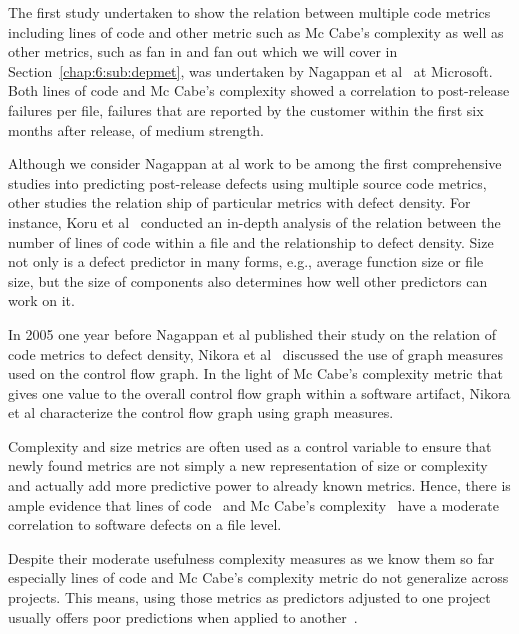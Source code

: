 The first study undertaken to show the relation between multiple code metrics including lines of code and other metric such as Mc Cabe's complexity as well as other metrics, such as fan in and fan out which we will cover in Section~\ref{chap:6:sub:depmet}, was undertaken by Nagappan et al~\cite{nagappan:icse:2006} at Microsoft.
Both lines of code and Mc Cabe's complexity showed a correlation to post-release failures per file, failures that are reported by the customer within the first six months after release, of medium strength.

Although we consider Nagappan at al work to be among the first comprehensive studies into predicting post-release defects using multiple source code metrics, other studies the relation ship of particular metrics with defect density.
For instance, Koru et al~\cite{koru:promise:2005} conducted an in-depth analysis of the relation between the number of lines of code within a file and the relationship to defect density.
Size not only is a defect predictor in many forms, e.g., average function size or file size, but the size of components also determines how well other predictors can work on it.

In 2005 one year before Nagappan et al published their study on the relation of code metrics to defect density, Nikora et al~\cite{nikora:metrics:2005} discussed the use of graph measures used on the control flow graph.
In the light of Mc Cabe's complexity metric that gives one value to the overall control flow graph within a software artifact, Nikora et al characterize the control flow graph using graph measures.

Complexity and size metrics are often used as a control variable to ensure that newly found metrics are not simply a new representation of size or complexity and actually add more predictive power to already known metrics.
Hence, there is ample evidence that lines of code~\cite{shihab:esem:2010,arisholm:isese:2006,jiang:promise:2008,knab:msr:2006,zhang:icsm:2009} and Mc Cabe's complexity~\cite{nagappan:icse:2006,shihab:fse:2011,zimmermann:fse:2009,jiang:promise:2008,zimmermann:promise:2007} have a moderate correlation to software defects on a file level.

Despite their moderate usefulness complexity measures as we know them so far especially lines of code and Mc Cabe's complexity metric do not generalize across projects.
This means, using those metrics as predictors adjusted to one project usually offers poor predictions when applied to another~\cite{zimmermann:fse:2009}. 


